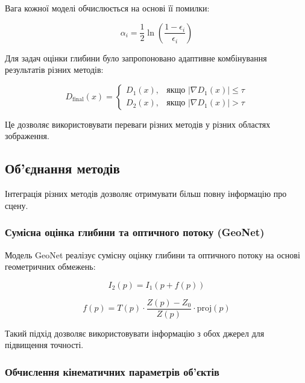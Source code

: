 \documentclass[14pt, a4paper]{extarticle}
\numberwithin{equation}{section}
\begin{document}
Вага кожної моделі обчислюється на основі її помилки:

\begin{equation}
\alpha_i = \frac{1}{2} \ln\left( \frac{1 - \epsilon_i}{\epsilon_i} \right) \tag{55}
\end{equation}

Для задач оцінки глибини було запропоновано адаптивне комбінування результатів різних методів:

\begin{equation}
D_{\text{final}}(x) = \begin{cases} 
D_1(x), & \text{якщо } |\nabla D_1(x)| \leq \tau \\ 
D_2(x), & \text{якщо } |\nabla D_1(x)| > \tau 
\end{cases} \tag{56}
\end{equation}

Це дозволяє використовувати переваги різних методів у різних областях зображення.

\subsection{Об'єднання методів}

Інтеграція різних методів дозволяє отримувати більш повну інформацію про сцену.

\subsubsection{Сумісна оцінка глибини та оптичного потоку (GeoNet)}

Модель GeoNet \cite{yin2019geonet} реалізує сумісну оцінку глибини та оптичного потоку на основі геометричних обмежень:

\begin{equation}
I_2(p) = I_1(p + f(p)) \tag{39}
\end{equation}

\begin{equation}
f(p) = T(p) \cdot \frac{Z(p) - Z_0}{Z(p)} \cdot \text{proj}(p) \tag{40}
\end{equation}

Такий підхід дозволяє використовувати інформацію з обох джерел для підвищення точності.

\subsubsection{Обчислення кінематичних параметрів об'єктів}
\end{document}
